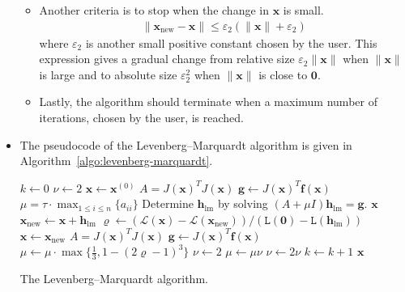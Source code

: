 \documentclass[10pt]{article}
\newcommand{\ve}[1]{\mathbf{#1}}
\newcommand{\mrm}[1]{\mathrm{#1}}
\newcommand{\mcal}[1]{\mathcal{#1}}
\begin{document}
\begin{itemize}
\begin{itemize}
        \item Another criteria is to stop when the change in $\ve{x}$ is small.
        \begin{align*}
            \| \ve{x}_{\mrm{new}} - \ve{x} \| \leq \varepsilon_2 (\| \ve{x}\| + \varepsilon_2)
        \end{align*}
        where $\varepsilon_2$ is another small positive constant chosen by the user. This expression gives a gradual change from relative size $\varepsilon_2 \| \ve{x}\|$ when $\| \ve{x}\|$ is large and to absolute size $\varepsilon_2^2$ when $\| \ve{x} \|$ is close to $\ve{0}$.

        \item Lastly, the algorithm should terminate when a maximum number of iterations, chosen by the user, is reached.
    \end{itemize}

    \item The pseudocode of the Levenberg--Marquardt algorithm is given in Algorithm~\ref{algo:levenberg-marquardt}.

    \begin{algorithm}[t]
        \begin{algorithmic}
            \State $k \gets 0$
            \State $\nu \gets 2$
            \State $\ve{x} \gets \ve{x}^{(0)}$
            \State $A = J(\ve{x})^T J(\ve{x})$
            \State $\ve{g} \gets J(\ve{x})^T \ve{f}(\ve{x})$
            \State $\mu = \tau \cdot \max_{1 \leq i \leq n} \{a_{ii}\}$
            \While {$\| \ve{g} \|_\infty > \varepsilon_1$ {\bf and} $k \leq k_{\max}$}
                \State Determine $\ve{h}_{\mrm{lm}}$ by solving $(A + \mu I)\ve{h}_{\mrm{lm}} = \ve{g}$.
                \If {$\| \ve{h}_{\mrm{lm}} \leq \varepsilon_2 (\| \ve{x}\| + \varepsilon_2)$}
                    \State \Return $\ve{x}$
                \EndIf
                \State $\ve{x}_{\mrm{new}} \gets \ve{x} + \ve{h}_{\mrm{lm}}$
                \State $\varrho \gets (\mcal{L}(\ve{x}) - \mcal{L}(\ve{x}_{\mrm{new}})) / (\mathtt{L}(\ve{0}) - \mathtt{L}(\ve{h}_{\mrm{lm}}))$
                    \State $\ve{x} \gets \ve{x}_{\mrm{new}}$
                    \State $A = J(\ve{x})^T J(\ve{x})$
                    \State $\ve{g} \gets J(\ve{x})^T \ve{f}(\ve{x})$
                    \State $\mu \gets \mu \cdot \max\{ \frac{1}{3}, 1 - (2\varrho -1)^3 \}$
                    \State $\nu \gets 2$
                \Else
                    \State $\mu \gets \mu \nu$
                    \State $\nu \gets 2\nu$
                \EndIf
                \State $k \gets k+1$
            \EndWhile
            \State \Return $\ve{x}$
        \end{algorithmic}
        \caption{The Levenberg--Marquardt algorithm.}
        \label{algo:levenberg-marquardt}
    \end{algorithm}
\end{itemize}




\end{document}

